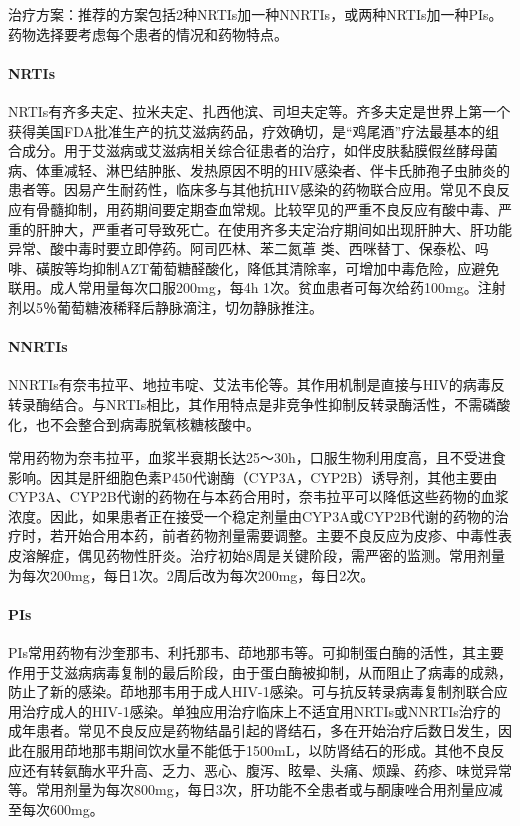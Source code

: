 治疗方案：推荐的方案包括2种NRTIs加一种NNRTIs，或两种NRTIs加一种PIs。药物选择要考虑每个患者的情况和药物特点。
\paragraph{NRTIs}

NRTIs有齐多夫定、拉米夫定、扎西他滨、司坦夫定等。齐多夫定是世界上第一个获得美国FDA批准生产的抗艾滋病药品，疗效确切，是“鸡尾酒”疗法最基本的组合成分。用于艾滋病或艾滋病相关综合征患者的治疗，如伴皮肤黏膜假丝酵母菌病、体重减轻、淋巴结肿胀、发热原因不明的HIV感染者、伴卡氏肺孢子虫肺炎的患者等。因易产生耐药性，临床多与其他抗HIV感染的药物联合应用。常见不良反应有骨髓抑制，用药期间要定期查血常规。比较罕见的严重不良反应有酸中毒、严重的肝肿大，严重者可导致死亡。在使用齐多夫定治疗期间如出现肝肿大、肝功能异常、酸中毒时要立即停药。阿司匹林、苯二氮䓬
类、西咪替丁、保泰松、吗啡、磺胺等均抑制AZT葡萄糖醛酸化，降低其清除率，可增加中毒危险，应避免联用。成人常用量每次口服200mg，每4h
1次。贫血患者可每次给药100mg。注射剂以5％葡萄糖液稀释后静脉滴注，切勿静脉推注。
\paragraph{NNRTIs}

NNRTIs有奈韦拉平、地拉韦啶、艾法韦伦等。其作用机制是直接与HIV的病毒反转录酶结合。与NRTIs相比，其作用特点是非竞争性抑制反转录酶活性，不需磷酸化，也不会整合到病毒脱氧核糖核酸中。

常用药物为奈韦拉平，血浆半衰期长达25～30h，口服生物利用度高，且不受进食影响。因其是肝细胞色素P450代谢酶（CYP3A，CYP2B）诱导剂，其他主要由CYP3A、CYP2B代谢的药物在与本药合用时，奈韦拉平可以降低这些药物的血浆浓度。因此，如果患者正在接受一个稳定剂量由CYP3A或CYP2B代谢的药物的治疗时，若开始合用本药，前者药物剂量需要调整。主要不良反应为皮疹、中毒性表皮溶解症，偶见药物性肝炎。治疗初始8周是关键阶段，需严密的监测。常用剂量为每次200mg，每日1次。2周后改为每次200mg，每日2次。
\paragraph{PIs}

PIs常用药物有沙奎那韦、利托那韦、茚地那韦等。可抑制蛋白酶的活性，其主要作用于艾滋病病毒复制的最后阶段，由于蛋白酶被抑制，从而阻止了病毒的成熟，防止了新的感染。茚地那韦用于成人HIV-1感染。可与抗反转录病毒复制剂联合应用治疗成人的HIV-1感染。单独应用治疗临床上不适宜用NRTIs或NNRTIs治疗的成年患者。常见不良反应是药物结晶引起的肾结石，多在开始治疗后数日发生，因此在服用茚地那韦期间饮水量不能低于1500mL，以防肾结石的形成。其他不良反应还有转氨酶水平升高、乏力、恶心、腹泻、眩晕、头痛、烦躁、药疹、味觉异常等。常用剂量为每次800mg，每日3次，肝功能不全患者或与酮康唑合用剂量应减至每次600mg。
